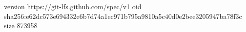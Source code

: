 version https://git-lfs.github.com/spec/v1
oid sha256:e62dc573e694332e6b7d74a1ec971b795a9810a5c40d0e2bee3205947ba78f3c
size 873958
